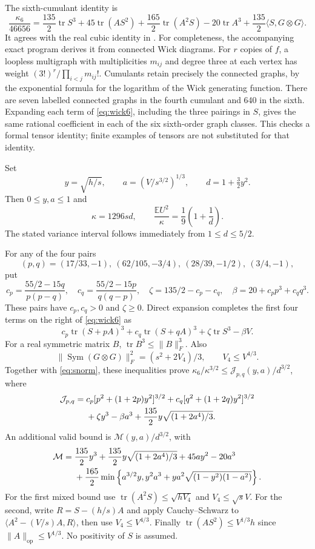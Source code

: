 \documentclass[11pt]{article}
\newcommand{\E}{\mathbb E}
\newcommand{\tr}{\operatorname{tr}}
\begin{document}
The sixth-cumulant identity is
\begin{equation}\label{eq:wick6}
 \frac{\kappa_6}{46656}
 =\frac{135}{2}\tr S^3+45\tr(AS^2)+\frac{165}{2}\tr(A^2S)
 -20\tr A^3+\frac{135}{2}\langle S,G\otimes G\rangle.
\end{equation}
It agrees with the real cubic identity in \cite[Eq.~(8.12)]{HJM}.
For completeness, the accompanying exact program derives it from connected
Wick diagrams. For $r$ copies of $f$, a loopless multigraph with
multiplicities $m_{ij}$ and degree three at each vertex has weight
$(3!)^r/\prod_{i<j}m_{ij}!$. Cumulants retain precisely the connected
graphs, by the exponential formula for the logarithm of the Wick generating
function. There are seven labelled connected graphs in the fourth cumulant
and 640 in the sixth. Expanding each term of \eqref{eq:wick6}, including
the three pairings in $S$, gives the same rational coefficient in each of
the six sixth-order graph classes. This checks a formal tensor identity;
finite examples of tensors are not substituted for that identity.

Set
\[
 y=\sqrt{h/s},\qquad a=(V/s^{3/2})^{1/3},\qquad d=1+\tfrac32y^2.
\]
Then $0\le y,a\le1$ and
\begin{equation}\label{eq:variance-shape}
 \kappa=1296sd,\qquad \frac{\E U^2}{\kappa}
 =\frac19\left(1+\frac1d\right).
\end{equation}
The stated variance interval follows immediately from $1\le d\le5/2$.

For any of the four pairs
\[
 (p,q)=(17/33,-1),\ (62/105,-3/4),\ (28/39,-1/2),\ (3/4,-1),
\]
put
\[
 c_p=\frac{55/2-15q}{p(p-q)},\quad
 c_q=\frac{55/2-15p}{q(q-p)},\quad
 \zeta=135/2-c_p-c_q,\quad \beta=20+c_pp^3+c_qq^3.
\]
These pairs have $c_p,c_q>0$ and $\zeta\ge0$. Direct expansion completes
the first four terms on the right of \eqref{eq:wick6} as
\[
 c_p\tr(S+pA)^3+c_q\tr(S+qA)^3+\zeta\tr S^3-\beta V.
\]
For a real symmetric matrix $B$, $\tr B^3\le\|B\|_F^3$.
Also
\[
 \|\operatorname{Sym}(G\otimes G)\|_F^2=(s^2+2V_4)/3,
 \qquad V_4\le V^{4/3}.
\]
Together with \eqref{eq:snorm}, these inequalities prove
$\kappa_6/\kappa^{3/2}\le\mathcal J_{p,q}(y,a)/d^{3/2}$, where
\begin{align}\label{eq:J}
 \mathcal J_{p,q}={}&c_p[p^2+(1+2p)y^2]^{3/2}
 +c_q[q^2+(1+2q)y^2]^{3/2}\notag\\
 &+\zeta y^3-\beta a^3+\frac{135}{2}y\sqrt{(1+2a^4)/3}.
\end{align}
An additional valid bound is $\mathcal M(y,a)/d^{3/2}$, with
\begin{align}\label{eq:M}
 \mathcal M={}&\frac{135}{2}y^3+\frac{135}{2}y\sqrt{(1+2a^4)/3}
 +45ay^2-20a^3\notag\\
 &+\frac{165}{2}\min\left\{a^{3/2}y,
 y^2a^3+ya^2\sqrt{(1-y^2)(1-a^2)}\right\}.
\end{align}
For the first mixed bound use
$\tr(A^2S)\le\sqrt{hV_4}$ and $V_4\le\sqrt{s}V$.
For the second, write $R=S-(h/s)A$ and apply Cauchy--Schwarz to
$\langle A^2-(V/s)A,R\rangle$, then use $V_4\le V^{4/3}$.
Finally $\tr(AS^2)\le V^{1/3}h$ since
$\|A\|_{\mathrm{op}}\le V^{1/3}$. No positivity of $S$ is assumed.
\end{document}
